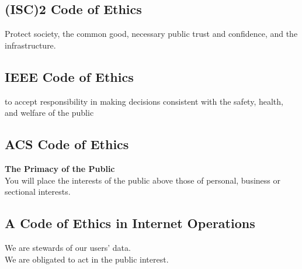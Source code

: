 \documentclass[xga]{xdvislides}
\begin{document}
\subsection{(ISC)2 Code of Ethics}
\Huge
\vspace*{\fill}
\begin{center}
Protect society, the common good, necessary public
trust and confidence, and the infrastructure.
\end{center}
\vspace*{\fill}
\Normalsize

\subsection{IEEE Code of Ethics}
\Huge
\vspace*{\fill}
\begin{center}
to accept responsibility in making decisions
consistent with the safety, health, and welfare of the
public
\end{center}
\vspace*{\fill}
\Normalsize

\subsection{ACS Code of Ethics}
\Huge
\vspace*{\fill}
\begin{center}

{\bf The Primacy of the Public} \\
You will place the interests of the public
above those of personal, business or sectional
interests.

\end{center}
\vspace*{\fill}
\Normalsize

\subsection{A Code of Ethics in Internet Operations}
\Huge
\vspace*{\fill}
\begin{center}

We are stewards of our users' data. \\

We are obligated to act in the public interest.

\end{center}
\vspace*{\fill}
\Normalsize
\end{document}
